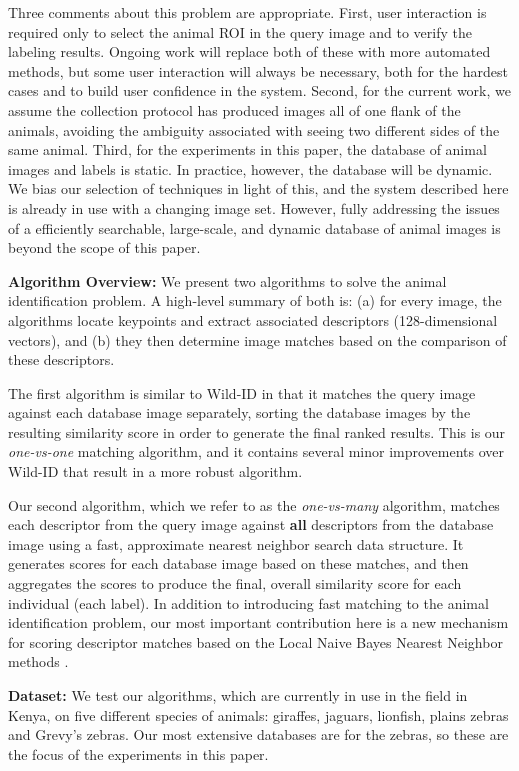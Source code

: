 Three comments about this problem are appropriate.  First, user
interaction is required only to select the animal ROI in the query image
and to verify the labeling results.  Ongoing work will replace both of
these with more automated methods, but some user interaction will
always be necessary, both for the hardest cases and to build user
confidence in the system.
Second, for the current work, we assume the collection protocol has produced images all of one flank of the animals, avoiding the ambiguity associated with seeing two different sides of the same animal.
Third, for the experiments in this paper,
the database of animal images and labels is
static. In practice, however, the database will be dynamic.  We bias
our selection of techniques in light of this, and the system
described here is already in use with a changing image set.
However, fully addressing the issues of a efficiently searchable, large-scale, and dynamic
database of animal images is beyond the scope of this paper.

\textbf{Algorithm Overview:} We present two algorithms to solve the
animal identification problem.  A high-level summary of both is:
(a) for every image, the algorithms locate keypoints and extract associated descriptors (128-dimensional
vectors), and (b) they then determine image matches based on the comparison of these descriptors.

  The first algorithm is similar to Wild-ID
\cite{11BoldgerWILDID} in that it matches the query image
against each database image separately, sorting the database images by the
resulting similarity score in order to generate the final ranked
results.  This is our \emph{one-vs-one} matching algorithm, and
it contains several minor improvements over Wild-ID that result in a more robust
algorithm.

Our second algorithm, which we refer to as the \emph{one-vs-many}
algorithm, matches each descriptor from the query image against
\textbf{all} descriptors from the database image using a fast,
approximate nearest neighbor search data structure.  It generates scores
for each database image based on these matches, and then aggregates
the scores to produce the final, overall similarity score for each
individual (each label).  In addition to introducing fast matching to the animal
identification problem, our most important contribution here is a new
mechanism for scoring descriptor matches based on the Local Naive Bayes Nearest %
Neighbor methods \cite{cvpr11McCannLNBNN}.

\textbf{Dataset:} We test our algorithms, which are currently in use in the
field in Kenya, on five different species of animals: giraffes,
jaguars, lionfish, plains zebras and Grevy's zebras.  Our most
extensive databases are for the zebras, so these are the focus of the
experiments in this paper.




